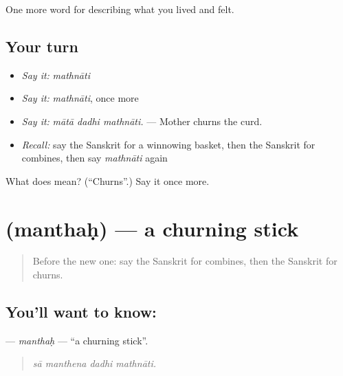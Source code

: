 \begin{grammarlens}[title={What you've built}]
One more word for describing what you lived and felt.
\end{grammarlens}

\subsection*{Your turn}
\begin{itemize}
\raggedright
  \item \emph{Say it:} \emph{mathnāti}
  \item \emph{Say it:} \emph{mathnāti}, once more
  \item \emph{Say it:} \emph{mātā dadhi mathnāti.} — Mother churns the curd.
  \item \emph{Recall:} say the Sanskrit for a winnowing basket, then the Sanskrit for combines, then say \emph{mathnāti} again
\end{itemize}

\begin{tcolorbox}[breakable,colback=teal!4,colframe=teal!35!black,title={Before you move on}]
What does  mean? (\textquotedblleft{}Churns\textquotedblright{}.) Say it once more.
\end{tcolorbox}
\section[\texorpdfstring{\sk{मन्थः} (manthaḥ)}{मन्थः (manthaḥ)}]{ (manthaḥ) — a churning stick}

\label{lesson:SA-C513-manthah}



\begin{quote}
Before the new one: say the Sanskrit for combines, then the Sanskrit for churns.
\end{quote}

\subsection*{You'll want to know: }
\textbf{} — \emph{manthaḥ} — \textquotedblleft{}a churning stick\textquotedblright{}.

\begin{quote}
   
\end{quote}

\begin{quote}
\emph{sā manthena dadhi mathnāti.}
\end{quote}

